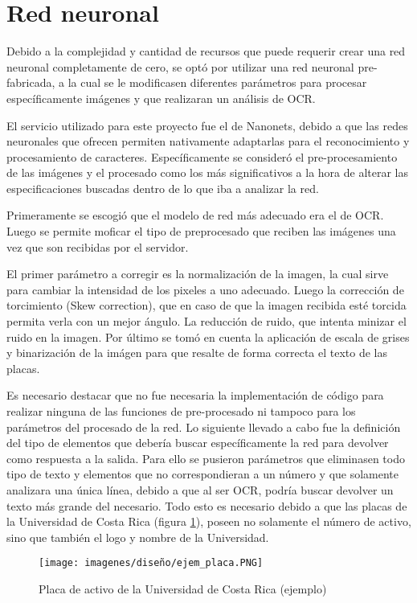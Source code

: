 \section{Red neuronal}
Debido a la complejidad y cantidad de recursos que puede requerir crear una red neuronal completamente de cero, se optó por utilizar una red neuronal pre-fabricada, a la cual se le modificasen diferentes parámetros para procesar específicamente imágenes y que realizaran un análisis de OCR. 
\par
El servicio utilizado para este proyecto fue el de Nanonets, debido a que las redes neuronales que ofrecen permiten nativamente adaptarlas para el reconocimiento y procesamiento de caracteres. Específicamente se consideró el pre-procesamiento de las imágenes y el procesado como los más significativos a la hora de alterar las especificaciones buscadas dentro de lo que iba a analizar la red.
\par
Primeramente se escogió que el modelo de red más adecuado era el de OCR. Luego se permite moficar el tipo de preprocesado que reciben las imágenes una vez que son recibidas por el servidor.
\par
El primer parámetro a corregir es la normalización de la imagen, la cual sirve para cambiar la intensidad de los pixeles a uno adecuado. Luego la corrección de torcimiento (Skew correction), que en caso de que la imagen recibida esté torcida permita verla con un mejor ángulo. La reducción de ruido, que intenta minizar el ruido en la imagen. Por último se tomó en cuenta la aplicación de escala de grises y binarización de la imágen para que resalte de forma correcta el texto de las placas.
\par
Es necesario destacar que no fue necesaria la implementación de código para realizar ninguna de las funciones de pre-procesado ni tampoco para los parámetros del procesado de la red. Lo siguiente llevado a cabo fue la definición del tipo de elementos que debería buscar específicamente la red para devolver como respuesta a la salida. Para ello se pusieron parámetros que eliminasen todo tipo de texto y elementos que no correspondieran a un número y que solamente analizara una única línea, debido a que al ser OCR, podría buscar devolver un texto más grande del necesario. Todo esto es necesario debido a que las placas de la Universidad de Costa Rica (figura \ref{ejem_placa}), poseen no solamente el número de activo, sino que también el logo y nombre de la Universidad.
\begin{figure}[H]
    \centering
    \texttt{[image: imagenes/diseño/ejem\_placa.PNG]}
    \caption{Placa de activo de la Universidad de Costa Rica (ejemplo)}
    \label{ejem_placa}
\end{figure}
